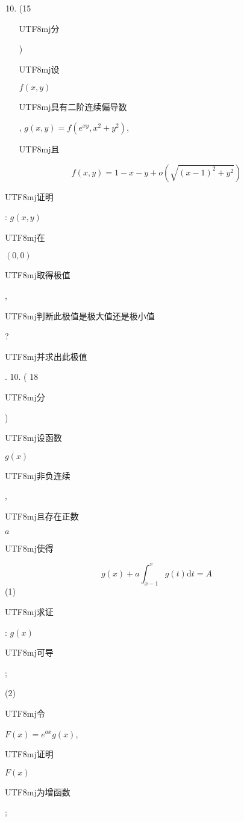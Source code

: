 \documentclass[10pt]{article}
\begin{document}
\begin{enumerate}
  \setcounter{enumi}{9}
  \item (15 \begin{CJK}{UTF8}{mj}分\end{CJK}) \begin{CJK}{UTF8}{mj}设\end{CJK} $f(x, y)$ \begin{CJK}{UTF8}{mj}具有二阶连续偏导数\end{CJK}, $g(x, y)=f\left(e^{x y}, x^{2}+y^{2}\right)$, \begin{CJK}{UTF8}{mj}且\end{CJK}
\end{enumerate}
$$
f(x, y)=1-x-y+o\left(\sqrt{(x-1)^{2}+y^{2}}\right)
$$
\begin{CJK}{UTF8}{mj}证明\end{CJK}: $g(x, y)$ \begin{CJK}{UTF8}{mj}在\end{CJK} $(0,0)$ \begin{CJK}{UTF8}{mj}取得极值\end{CJK}, \begin{CJK}{UTF8}{mj}判断此极值是极大值还是极小值\end{CJK}? \begin{CJK}{UTF8}{mj}并求出此极值\end{CJK}. 10. ( 18 \begin{CJK}{UTF8}{mj}分\end{CJK}) \begin{CJK}{UTF8}{mj}设函数\end{CJK} $g(x)$ \begin{CJK}{UTF8}{mj}非负连续\end{CJK}, \begin{CJK}{UTF8}{mj}且存在正数\end{CJK} $a$ \begin{CJK}{UTF8}{mj}使得\end{CJK}
$$
g(x)+a \int_{x-1}^{x} g(t) \mathrm{d} t=A
$$
(1) \begin{CJK}{UTF8}{mj}求证\end{CJK}: $g(x)$ \begin{CJK}{UTF8}{mj}可导\end{CJK};

(2) \begin{CJK}{UTF8}{mj}令\end{CJK} $F(x)=e^{a x} g(x)$, \begin{CJK}{UTF8}{mj}证明\end{CJK} $F(x)$ \begin{CJK}{UTF8}{mj}为增函数\end{CJK};
\end{document}
